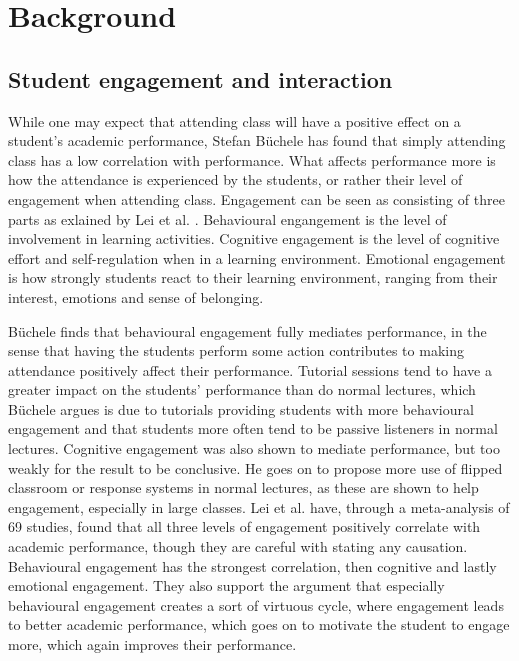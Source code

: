 \chapter{Background}\label{chap:background}


\section{Student engagement and interaction}
While one may expect that attending class will have a positive effect on a student's academic performance, Stefan Büchele \cite{Buchele2021} has found that simply attending class has a low correlation with performance. What affects performance more is how the attendance is experienced by the students, or rather their level of engagement when attending class. Engagement can be seen as consisting of three parts as exlained by Lei et al. \cite{lei2018}. Behavioural engangement is the level of involvement in learning activities. Cognitive engagement is the level of cognitive effort and self-regulation when in a learning environment. Emotional engagement is how strongly students react to their learning environment, ranging from their interest, emotions and sense of belonging.

Büchele \cite{Buchele2021} finds that behavioural engagement fully mediates performance, in the sense that having the students perform some action contributes to making attendance positively affect their performance. Tutorial sessions tend to have a greater impact on the students' performance than do normal lectures, which Büchele argues is due to tutorials providing students with more behavioural engagement and that students more often tend to be passive listeners in normal lectures. Cognitive engagement was also shown to mediate performance, but too weakly for the result to be conclusive. He goes on to propose more use of flipped classroom or response systems in normal lectures, as these are shown to help engagement, especially in large classes. Lei et al. \cite{lei2018} have, through a meta-analysis of 69 studies, found that all three levels of engagement positively correlate with academic performance, though they are careful with stating any causation. Behavioural engagement has the strongest correlation, then cognitive and lastly emotional engagement. They also support the argument that especially behavioural engagement creates a sort of virtuous cycle, where engagement leads to better academic performance, which goes on to motivate the student to engage more, which again improves their performance. 

